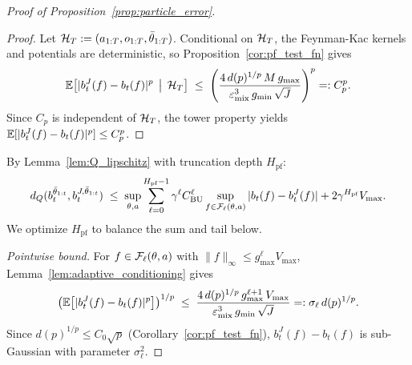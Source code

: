 \begin{proof}[Proof of Proposition~\ref{prop:particle_error}]
    \begin{proof}
    Let ${\mathcal{H}}_T:=(a_{1:T},o_{1:T},\bar\theta_{1:T})$. Conditional on ${\mathcal{H}}_T$, the Feynman-Kac kernels and potentials are deterministic, so Proposition~\ref{cor:pf_test_fn} gives
    \[
    \mathbb{E}\bigl[|b_t^J(f)-b_t(f)|^p\,\bigm|\,{\mathcal{H}}_T\bigr]
    \;\le\;
    \left(\frac{4\,d(p)^{1/p}\,M\,g_{\max}}{\varepsilon_{\mathrm{mix}}^3\,g_{\min}\,\sqrt{J}}\right)^p
    =:C_p^p.
    \]
    Since $C_p$ is independent of ${\mathcal{H}}_T$, the tower property yields $\mathbb{E}[|b_t^J(f)-b_t(f)|^p]\le C_p^p$.
    \end{proof}

    By Lemma~\ref{lem:Q_lipschitz} with truncation depth $H_{\mathrm{pf}}$:
    \begin{equation}\label{eq:dQ_via_test}
    d_Q(b_t^{\bar\theta_{1:t}},b_t^{J,\bar\theta_{1:t}})
    \;\le\;
    \sup_{\theta,a}\sum_{\ell=0}^{H_{\mathrm{pf}}-1}\gamma^\ell C_{\mathrm{BU}}^\ell\sup_{f\in{\mathcal{F}}_\ell(\theta,a)}|b_t(f)-b_t^J(f)|
    +2\gamma^{H_{\mathrm{pf}}} V_{\max}.
    \end{equation}
    We optimize $H_{\mathrm{pf}}$ to balance the sum and tail below.

    \emph{Pointwise bound.} For $f\in{\mathcal{F}}_\ell(\theta,a)$ with $\|f\|_\infty\le g_{\max}^\ell V_{\max}$, Lemma~\ref{lem:adaptive_conditioning} gives
    \begin{equation}\label{eq:pointwise_pf}
    \bigl(\mathbb{E}\bigl[|b_t^J(f)-b_t(f)|^p\bigr]\bigr)^{1/p}
    \;\le\;
    \frac{4\,d(p)^{1/p}\,g_{\max}^{\ell+1}\,V_{\max}}{\varepsilon_{\mathrm{mix}}^3\,g_{\min}\,\sqrt{J}}
    =:\sigma_\ell\,d(p)^{1/p}.
    \end{equation}
    Since $d(p)^{1/p}\le C_0\sqrt{p}$ (Corollary~\ref{cor:pf_test_fn}), $b_t^J(f)-b_t(f)$ is sub-Gaussian with parameter $\sigma_\ell^2$.


\end{proof}
